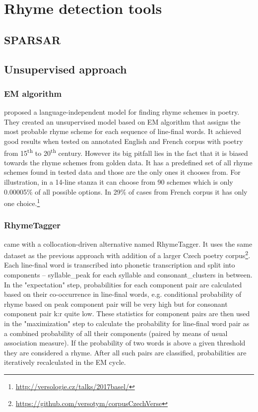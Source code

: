 \section{Rhyme detection tools}
\subsection{SPARSAR}


\subsection{Unsupervised approach}
\subsubsection*{EM algorithm}
\cite{reddy2011unsupervised} proposed a language-independent model for finding rhyme schemes in poetry. They created an unsupervised model based on EM algorithm that assigns the most probable rhyme scheme for each sequence of line-final words. It achieved good results when tested on annotated English and French corpus with poetry from 15\textsuperscript{th} to 20\textsuperscript{th} century. However its big pitfall lies in the fact that it is biased towards the rhyme schemes from golden data. It has a predefined set of all rhyme schemes found in tested data and those are the only ones it chooses from. For illustration, in a 14-line stanza it can choose from 90 schemes which is only 0.00005\% of all possible options. In 29\% of cases from French corpus it has only one choice.\footnote{\url{http://versologie.cz/talks/2017basel/}}

\subsubsection*{RhymeTagger}
\cite{plechavc2018collocation} came with a collocation-driven alternative named RhymeTagger. It uses the same dataset as the previous approach with addition of a larger Czech poetry corpus\footnote{\url{https://github.com/versotym/corpusCzechVerse}}. Each line-final word is transcribed into phonetic transcription and split into components -- \gls{syllable_peak} for each syllable and \gls{consonant_clusters} in between. In the "expectation" step, probabilities for each component pair are calculated based on their co-occurrence in line-final words, e.g. conditional probability of rhyme based on peak component pair  will be very high but for consonant component pair k:r quite low. These statistics for component pairs are then used in the "maximization" step to calculate the probability for line-final word pair as a combined probability of all their components (paired by means of usual association measure). If the probability of two words is above a given threshold they are considered a rhyme. After all such pairs are classified, probabilities are iteratively recalculated in the EM cycle. 

